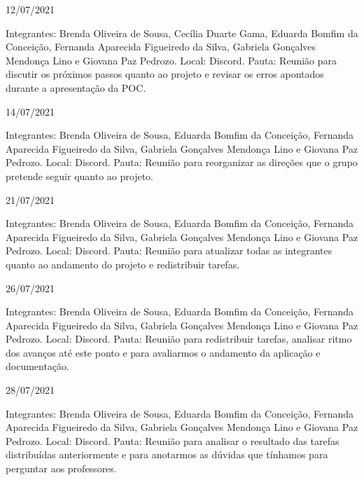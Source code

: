 \begin{apendicesenv}
\begin{flushleft}
12/07/2021 

Integrantes: Brenda Oliveira de Sousa, Cecília Duarte Gama, Eduarda Bomfim da Conceição, Fernanda Aparecida Figueiredo da Silva, Gabriela Gonçalves Mendonça Lino e Giovana Paz Pedrozo.
\newline
Local: \gls{Discord}.
\newline
Pauta: Reunião para discutir os próximos passos quanto ao projeto e revisar os erros apontados durante a apresentação da \ac{POC}.

14/07/2021 

Integrantes: Brenda Oliveira de Sousa, Eduarda Bomfim da Conceição, Fernanda Aparecida Figueiredo da Silva, Gabriela Gonçalves Mendonça Lino e Giovana Paz Pedrozo.
\newline
Local: \gls{Discord}.
\newline
Pauta: Reunião para reorganizar as direções que o grupo pretende seguir quanto ao projeto.

21/07/2021 

Integrantes: Brenda Oliveira de Sousa, Eduarda Bomfim da Conceição, Fernanda Aparecida Figueiredo da Silva, Gabriela Gonçalves Mendonça Lino e Giovana Paz Pedrozo.
\newline
Local: \gls{Discord}.
\newline
Pauta: Reunião para atualizar todas as integrantes quanto ao andamento do projeto e redistribuir tarefas.

26/07/2021 

Integrantes: Brenda Oliveira de Sousa, Eduarda Bomfim da Conceição, Fernanda Aparecida Figueiredo da Silva, Gabriela Gonçalves Mendonça Lino e Giovana Paz Pedrozo.
\newline
Local: \gls{Discord}.
\newline
Pauta: Reunião para redistribuir tarefas, analisar ritmo dos avanços até este ponto e para avaliarmos o andamento da aplicação e documentação.

28/07/2021 

Integrantes: Brenda Oliveira de Sousa, Eduarda Bomfim da Conceição, Fernanda Aparecida Figueiredo da Silva, Gabriela Gonçalves Mendonça Lino e Giovana Paz Pedrozo.
\newline
Local: \gls{Discord}.
\newline
Pauta: Reunião para analisar o resultado das tarefas distribuídas anteriormente e para anotarmos as dúvidas que tínhamos para perguntar aos professores.

\end{flushleft}


\end{apendicesenv}
